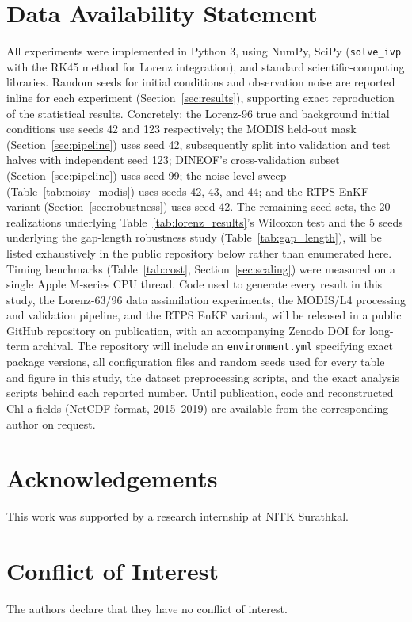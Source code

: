 \documentclass[final,5p,times,twocolumn,authoryear]{elsarticle}
\begin{document}
\section*{Data Availability Statement}
All experiments were implemented in Python 3, using NumPy, SciPy
(\texttt{solve\_ivp} with the RK45 method for Lorenz integration),
and standard scientific-computing libraries. Random seeds for
initial conditions and observation noise are reported inline for
each experiment (Section~\ref{sec:results}), supporting exact
reproduction of the statistical results. Concretely: the Lorenz-96
true and background initial conditions use seeds 42 and 123
respectively; the MODIS held-out mask (Section~\ref{sec:pipeline})
uses seed 42, subsequently split into validation and test halves
with independent seed 123; DINEOF's cross-validation subset
(Section~\ref{sec:pipeline}) uses seed 99; the noise-level sweep
(Table~\ref{tab:noisy_modis}) uses seeds 42, 43, and 44; and the RTPS
EnKF variant (Section~\ref{sec:robustness}) uses seed 42. The
remaining seed sets, the 20 realizations underlying
Table~\ref{tab:lorenz_results}'s Wilcoxon test and the 5 seeds
underlying the gap-length robustness study
(Table~\ref{tab:gap_length}), will be listed exhaustively in the
public repository below rather than enumerated here. Timing benchmarks
(Table~\ref{tab:cost}, Section~\ref{sec:scaling}) were measured on a
single Apple M-series CPU thread. Code used to generate every result
in this study, the Lorenz-63/96 data assimilation experiments, the
MODIS/L4 processing and validation pipeline, and the RTPS EnKF
variant, will be released in a public GitHub repository on
publication, with an accompanying Zenodo DOI for long-term archival.
The repository will include an \texttt{environment.yml} specifying
exact package versions, all configuration files and random seeds
used for every table and figure in this study, the dataset
preprocessing scripts, and the exact analysis scripts behind each
reported number. Until publication, code and reconstructed Chl-a
fields (NetCDF format, 2015--2019) are available from the
corresponding author on request.

\section*{Acknowledgements}
This work was supported by a research internship at NITK Surathkal.

\section*{Conflict of Interest}
The authors declare that they have no conflict of interest.
\end{document}
